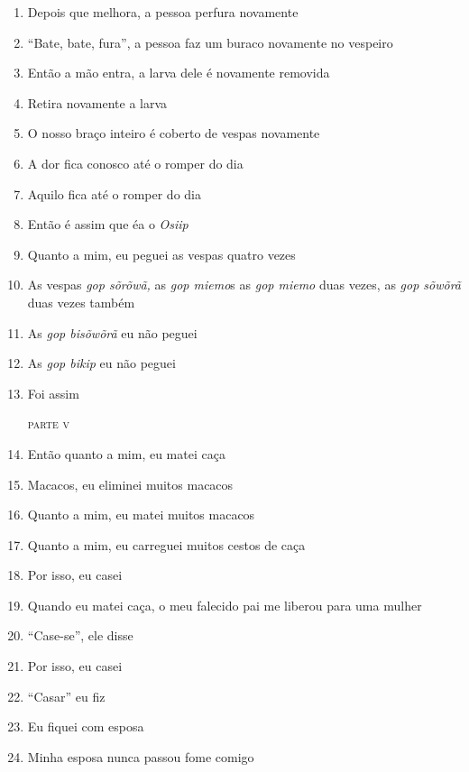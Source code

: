 \begin{enumerate}
 \item Depois que melhora, a pessoa perfura novamente
 \item ``Bate, bate, fura'', a pessoa faz um buraco novamente no vespeiro
 \item Então a mão entra, a larva dele é novamente removida
 \item Retira novamente a larva
 \item O nosso braço inteiro é coberto de vespas novamente
 \item A dor fica conosco até o romper do dia
 \item Aquilo fica até o romper do dia
 
 \begin{center}\end{center}
 
 \item Então é assim que éa o \textit{Osiip}
 \item Quanto a mim, eu peguei as vespas quatro vezes
 \item As vespas \textit{gop sõrõwã,} as \textit{gop miemo}s as \textit{gop miemo} duas vezes, as \textit{gop sõwõrã} duas vezes também
 \item As \textit{gop bisõwõrã} eu não peguei
 \item As \textit{gop bikip} eu não peguei
 \item Foi assim
 
 \begin{flushright}\textsc{parte v}\end{flushright}
 
 \item Então quanto a mim, eu matei caça
 \item Macacos, eu eliminei muitos macacos
 \item Quanto a mim, eu matei muitos macacos
 \item Quanto a mim, eu carreguei muitos cestos de caça
 
 \begin{center}\end{center}
 
 \item Por isso, eu casei
 \item Quando eu matei caça, o meu falecido pai me liberou para uma mulher
 \item ``Case-se'', ele disse
 \item Por isso, eu casei
 \item ``Casar'' eu fiz
 \item Eu fiquei com esposa
 \item  Minha esposa nunca passou fome comigo
 

\end{enumerate}
